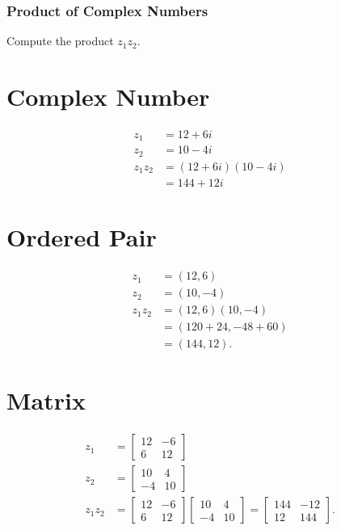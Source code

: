 \subsubsection{Product of Complex Numbers}
Compute the product $z_{1} z_{2}$.

\section{Complex Number}
$$
\begin{aligned}
z_{1} & =12+6 i \\
z_{2} & =10-4 i \\
z_{1} z_{2} & =(12+6 i)(10-4 i) \\
& =144+12 i
\end{aligned}
$$

\section{Ordered Pair}
$$
\begin{aligned}
z_{1} & =(12,6) \\
z_{2} & =(10,-4) \\
z_{1} z_{2} & =(12,6)(10,-4) \\
& =(120+24,-48+60) \\
& =(144,12) .
\end{aligned}
$$

\section{Matrix}
$$
\begin{aligned}
z_{1} & =\left[\begin{array}{cc}
12 & -6 \\
6 & 12
\end{array}\right] \\
z_{2} & =\left[\begin{array}{cc}
10 & 4 \\
-4 & 10
\end{array}\right] \\
z_{1} z_{2} & =\left[\begin{array}{cc}
12 & -6 \\
6 & 12
\end{array}\right]\left[\begin{array}{cc}
10 & 4 \\
-4 & 10
\end{array}\right]=\left[\begin{array}{cc}
144 & -12 \\
12 & 144
\end{array}\right] .
\end{aligned}
$$


